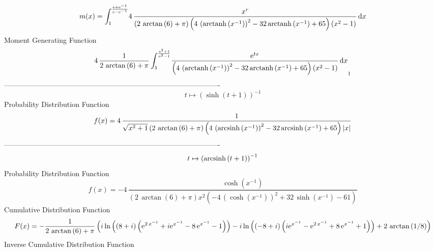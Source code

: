 \documentclass[12pt]{article}
\begin{document}
 $$ m(x) = \int_{1}^{{\frac {{\rm e}+{{\rm e}^{-1}}}{{\rm e}-{{\rm e}^{-1}}}}}\!4
\,{\frac {{x}^{r}}{ \left( 2\,\arctan \left( 6 \right) +\pi \right) 
 \left( 4\, \left( {\rm arctanh} \left({x}^{-1}\right) \right) ^{2}-32
\,{\rm arctanh} \left({x}^{-1}\right)+65 \right)  \left( {x}^{2}-1
 \right) }}\,{\rm d}x
$$ Moment Generating Function 
 $$4\,{\frac {1}{2\,\arctan \left( 6 \right) +\pi}\int_{1}^{{\frac {{
{\rm e}^{2}}+1}{{{\rm e}^{2}}-1}}}\!{\frac {{{\rm e}^{tx}}}{ \left( 4
\, \left( {\rm arctanh} \left({x}^{-1}\right) \right) ^{2}-32\,
{\rm arctanh} \left({x}^{-1}\right)+65 \right)  \left( {x}^{2}-1
 \right) }}\,{\rm d}x}_{{1}}
$$-------------------------------------------------------------------------------------------  \\$$t\mapsto  \left( \sinh \left( t+1 \right)  \right) ^{-1}
$$Probability Distribution Function 
$$  f(x)=4\,{\frac {1}{\sqrt {{x}^{2}+1} \left( 2\,\arctan \left( 6 \right) +
\pi \right)  \left( 4\, \left( {\rm arcsinh} \left({x}^{-1}\right)
 \right) ^{2}-32\,{\rm arcsinh} \left({x}^{-1}\right)+65 \right) 
 \left| x \right| }}
$$-------------------------------------------------------------------------------------------  \\$$t\mapsto  \left( {\rm arcsinh} \left(t+1\right) \right) ^{-1}
$$Probability Distribution Function 
$$  f(x)=-4\,{\frac {\cosh \left( {x}^{-1} \right) }{ \left( 2\,\arctan \left( 
6 \right) +\pi \right) {x}^{2} \left( -4\, \left( \cosh \left( {x}^{-1
} \right)  \right) ^{2}+32\,\sinh \left( {x}^{-1} \right) -61 \right) 
}}
$$Cumulative Distribution Function  
 $$F(x)=-{\frac {1}{2\,\arctan \left( 6 \right) +\pi} \left( i\ln  \left( 
 \left( 8+i \right)  \left( {{\rm e}^{2\,{x}^{-1}}}+i{{\rm e}^{{x}^{-1
}}}-8\,{{\rm e}^{{x}^{-1}}}-1 \right)  \right) -i\ln  \left(  \left( -
8+i \right)  \left( i{{\rm e}^{{x}^{-1}}}-{{\rm e}^{2\,{x}^{-1}}}+8\,{
{\rm e}^{{x}^{-1}}}+1 \right)  \right) +2\,\arctan \left( 1/8 \right) 
 \right) }
$$ Inverse Cumulative Distribution Function 
\end{document}
